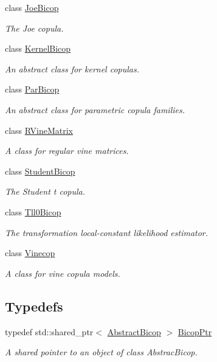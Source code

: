 \begin{DoxyCompactItemize}
\item 
class \hyperlink{classvinecopulib_1_1_joe_bicop}{Joe\+Bicop}
\begin{DoxyCompactList}\small\item\em The Joe copula. \end{DoxyCompactList}\item 
class \hyperlink{classvinecopulib_1_1_kernel_bicop}{Kernel\+Bicop}
\begin{DoxyCompactList}\small\item\em An abstract class for kernel copulas. \end{DoxyCompactList}\item 
class \hyperlink{classvinecopulib_1_1_par_bicop}{Par\+Bicop}
\begin{DoxyCompactList}\small\item\em An abstract class for parametric copula families. \end{DoxyCompactList}\item 
class \hyperlink{classvinecopulib_1_1_r_vine_matrix}{R\+Vine\+Matrix}
\begin{DoxyCompactList}\small\item\em A class for regular vine matrices. \end{DoxyCompactList}\item 
class \hyperlink{classvinecopulib_1_1_student_bicop}{Student\+Bicop}
\begin{DoxyCompactList}\small\item\em The Student t copula. \end{DoxyCompactList}\item 
class \hyperlink{classvinecopulib_1_1_tll0_bicop}{Tll0\+Bicop}
\begin{DoxyCompactList}\small\item\em The transformation local-\/constant likelihood estimator. \end{DoxyCompactList}\item 
class \hyperlink{classvinecopulib_1_1_vinecop}{Vinecop}
\begin{DoxyCompactList}\small\item\em A class for vine copula models. \end{DoxyCompactList}\end{DoxyCompactItemize}
\subsection*{Typedefs}
\begin{DoxyCompactItemize}
\item 
typedef std\+::shared\+\_\+ptr$<$ \hyperlink{classvinecopulib_1_1_abstract_bicop}{Abstract\+Bicop} $>$ \hyperlink{namespacevinecopulib_afd73d02952b845883499cbbda1996204}{Bicop\+Ptr}\hypertarget{namespacevinecopulib_afd73d02952b845883499cbbda1996204}{}\label{namespacevinecopulib_afd73d02952b845883499cbbda1996204}

\begin{DoxyCompactList}\small\item\em A shared pointer to an object of class Abstrac\+Bicop. \end{DoxyCompactList}\end{DoxyCompactItemize}
